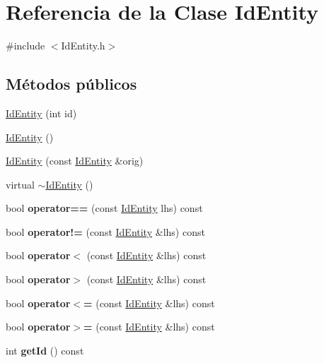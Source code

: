 \hypertarget{classIdEntity}{}\section{Referencia de la Clase Id\+Entity}
\label{classIdEntity}


{\ttfamily \#include $<$Id\+Entity.\+h$>$}

\subsection*{Métodos públicos}
\begin{DoxyCompactItemize}
\item 
\hyperlink{classIdEntity_ae1d9bb5704ec03ec7b940e71fec68cd7}{Id\+Entity} (int id)
\item 
\hyperlink{classIdEntity_a4a8769f110d882e6a5954a7d242a9b8a}{Id\+Entity} ()
\item 
\hyperlink{classIdEntity_aed12ca9eb669e2f6fdd127a717b81d48}{Id\+Entity} (const \hyperlink{classIdEntity}{Id\+Entity} \&orig)
\item 
virtual \hyperlink{classIdEntity_a3d5a29e369f066892a8df8eb0b6a1695}{$\sim$\+Id\+Entity} ()
\item 
\hypertarget{classIdEntity_ad974b59e551e9021edfa791cc5cc378f}{}bool {\bfseries operator==} (const \hyperlink{classIdEntity}{Id\+Entity} lhs) const \label{classIdEntity_ad974b59e551e9021edfa791cc5cc378f}

\item 
\hypertarget{classIdEntity_a75cb74ff41413957f2a24efffa1ba374}{}bool {\bfseries operator!=} (const \hyperlink{classIdEntity}{Id\+Entity} \&lhs) const \label{classIdEntity_a75cb74ff41413957f2a24efffa1ba374}

\item 
\hypertarget{classIdEntity_ab096d00789f0654dfeec665e99df94dc}{}bool {\bfseries operator$<$} (const \hyperlink{classIdEntity}{Id\+Entity} \&lhs) const \label{classIdEntity_ab096d00789f0654dfeec665e99df94dc}

\item 
\hypertarget{classIdEntity_a0a2a93f6cd371edc28afa06f80d3ae6c}{}bool {\bfseries operator$>$} (const \hyperlink{classIdEntity}{Id\+Entity} \&lhs) const \label{classIdEntity_a0a2a93f6cd371edc28afa06f80d3ae6c}

\item 
\hypertarget{classIdEntity_a5161f71d20c4affc3c98d738b80f3dfd}{}bool {\bfseries operator$<$=} (const \hyperlink{classIdEntity}{Id\+Entity} \&lhs) const \label{classIdEntity_a5161f71d20c4affc3c98d738b80f3dfd}

\item 
\hypertarget{classIdEntity_af40f1b52b82ba155bbc8b8634eb07518}{}bool {\bfseries operator$>$=} (const \hyperlink{classIdEntity}{Id\+Entity} \&lhs) const \label{classIdEntity_af40f1b52b82ba155bbc8b8634eb07518}

\item 
\hypertarget{classIdEntity_a1b1312f974928ffb127f8f38b3784a27}{}int {\bfseries get\+Id} () const \label{classIdEntity_a1b1312f974928ffb127f8f38b3784a27}

\end{DoxyCompactItemize}


